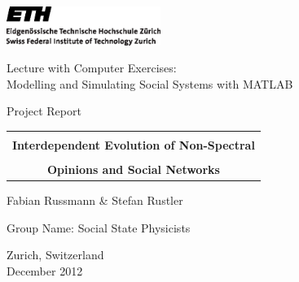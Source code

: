 
\thispagestyle{empty}

\begin{center}
\includegraphics[width=5cm]{ETHlogo.eps}

\bigskip


\bigskip


\bigskip


\LARGE{ 	Lecture with Computer Exercises:\\ }
\LARGE{ Modelling and Simulating Social Systems with MATLAB\\}

\bigskip

\bigskip

\small{Project Report}\\

\bigskip

\bigskip

\bigskip

\bigskip


\begin{tabular}{|c|}
\hline
\\
\textbf{\LARGE{Interdependent Evolution of Non-Spectral}}\\
\\


\textbf{\LARGE{Opinions and Social Networks}}
\\
\hline
\end{tabular}
\bigskip

\bigskip

\bigskip



\LARGE{Fabian Russmann \& Stefan Rustler}


Group Name: Social State Physicists

\bigskip

\bigskip

\bigskip

\bigskip

\bigskip

\bigskip

\bigskip

\bigskip

Zurich, Switzerland\\
December 2012\\

\end{center}


